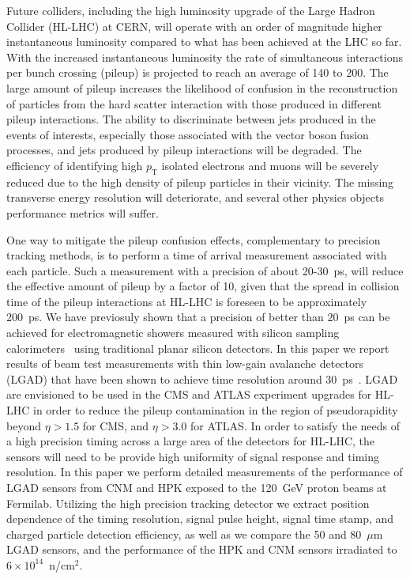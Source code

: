 \documentclass[preprint,1p]{elsarticle}
\begin{document}
Future colliders, including the high luminosity upgrade of the Large Hadron
Collider (HL-LHC) at CERN, will operate with an order of magnitude higher
instantaneous luminosity compared to what has been achieved at the LHC so far.
With the increased instantaneous luminosity the rate of simultaneous
interactions per bunch crossing (pileup) is projected to reach an average of 140
to 200. The large amount of pileup increases the likelihood of confusion in the
reconstruction of particles from the hard scatter interaction with those
produced in different pileup interactions. The ability to discriminate between
jets produced in the events of interests, especially those associated with the
vector boson fusion processes, and jets produced by pileup interactions will be
degraded. The efficiency of identifying high $p_{\mathrm{T}}$ isolated electrons
and muons will be severely reduced due to the high density of pileup particles
in their vicinity. The missing transverse energy resolution will deteriorate, and several
other physics objects performance metrics will suffer.

One way to mitigate the pileup confusion effects, complementary to precision
tracking methods, is to perform a time of arrival measurement associated with
each particle. Such a measurement with a precision of about 20-30~ps, will
reduce the effective amount of pileup by a factor of 10, given that the spread
in collision time of the pileup interactions at HL-LHC is foreseen to be
approximately 200~ps. We have previosuly shown that a precision of better than
$20$~ps can be achieved for electromagnetic showers measured with silicon
sampling calorimeters~\cite{Apresyan201662,Apresyan2017_NSSMIC,AKCHURIN201731}
using traditional planar silicon detectors. In this paper we report results of
beam test measurements with thin low-gain avalanche detectors (LGAD) that have
been shown to achieve time resolution around 30~ps~\cite{Cartiglia201783}. LGAD
are envisioned to be used in the CMS and ATLAS experiment upgrades for HL-LHC in
order to reduce the pileup contamination in the region of pseudorapidity beyond
$\eta>1.5$ for CMS, and $\eta>3.0$ for ATLAS. In order to satisfy the needs of a
high precision timing across a large area of the detectors for HL-LHC, the
sensors will need to be provide high uniformity of signal response and timing
resolution. In this paper we perform detailed measurements of the performance of
LGAD sensors from CNM and HPK exposed to the 120~GeV proton beams at Fermilab.
Utilizing the high precision tracking detector we extract position dependence of
the timing resolution, signal pulse height, signal time stamp, and charged
particle detection efficiency, as well as we compare the 50 and 80~$\mu$m LGAD
sensors, and the performance of the HPK and CNM sensors irradiated to $6\times
10^{14}$~n/cm$^2$.
\end{document}
